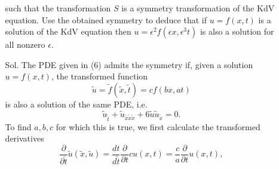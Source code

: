 \documentclass[]{report}
\begin{document}
\begin{itemize}
\begin{itemize}
		such that the transformation $S$ is a symmetry transformation of the KdV equation. Use the obtained symmetry to deduce that if $u = f(x, t)$ is a solution of the KdV equation then $u = \epsilon^2f(\epsilon x, \epsilon^3 t)$ is also a solution for all nonzero $\epsilon$.
		\item[Sol.] The PDE given in (6) admits the symmetry if, given a solution $u = f(x, t)$, the transformed function \[\tilde{u} = \tilde{f}(\tilde{x},\tilde{t})=cf(bx,at)\] 
		is also a solution of the same PDE, i.e.
		\begin{equation}
			\tilde{u}_{\tilde{t}} + \tilde{u}_{\tilde{x}\tilde{x}\tilde{x}} + 6\tilde{u}\tilde{u}_{\tilde{x}} = 0.
		\end{equation}
		To find $a,b,c$ for which this is true, we first calculate the transformed derivatives
		\[\frac{\partial}{\partial\tilde{t}}\tilde{u}(\tilde{x},\tilde{u})=\frac{dt}{d\tilde{t}}\frac{\partial}{\partial t}cu(x,t)=\frac{c}{a}\frac{\partial}{\partial t} u(x,t),\]
		

\end{itemize}
\end{itemize}
\end{document}
